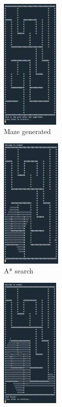 \documentclass[11pt]{article}
\begin{document}
\begin{figure}[H]
\centering
\begin{subfigure}{0.24\textwidth}
    \centering
    \includegraphics[height=6.5cm]{Maze_Generated} 
    \caption{Maze generated}
    \label{fig:subim8}
\end{subfigure}
\begin{subfigure}{0.24\textwidth}
    \centering
    \includegraphics[height=6.5cm]{A_Star_Search_Maze}
    \caption{A* search}
    \label{fig:subim9}
\end{subfigure}
\begin{subfigure}{0.24\textwidth}
    \centering
    \includegraphics[height=6.5cm]{A_Star_Path_Found_Maze}

\end{subfigure}
\end{figure}
\end{document}
